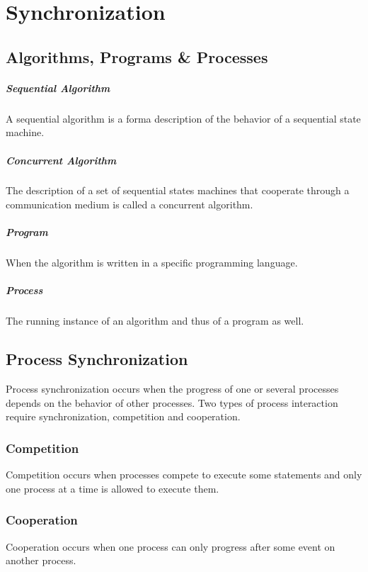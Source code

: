 \chapter{Synchronization}

\section{Algorithms, Programs \& Processes}

\paragraph{Sequential Algorithm}
A sequential algorithm is a forma description of the behavior of a sequential state machine.

\paragraph{Concurrent Algorithm}
The description of a set of sequential states machines that cooperate through a communication medium is called a concurrent algorithm.

\paragraph{Program}
When the algorithm is written in a specific programming language.

\paragraph{Process}
The running instance of an algorithm and thus of a program as well.

\section{Process Synchronization}
Process synchronization occurs when the progress of one or several processes depends on the behavior of other processes.
Two types of process interaction require synchronization, competition and cooperation.

\subsection{Competition}
Competition occurs when processes compete to execute some statements and only one process at a time is allowed to execute them.

\subsection{Cooperation}
Cooperation occurs when one process can only progress after some event on another process.


